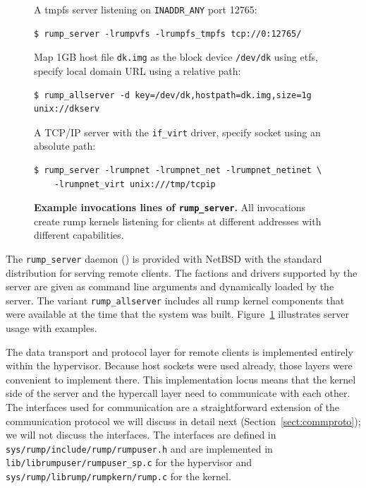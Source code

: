 \begin{figure}[t]
\begin{flushleft}
A tmpfs server listening on \verb+INADDR_ANY+ port 12765:
{\small
\begin{verbatim}
$ rump_server -lrumpvfs -lrumpfs_tmpfs tcp://0:12765/
\end{verbatim}}
Map 1GB host file \texttt{dk.img} as the block device \texttt{/dev/dk}
using etfs, specify local domain URL using a relative path:
{\small
\begin{verbatim}
$ rump_allserver -d key=/dev/dk,hostpath=dk.img,size=1g unix://dkserv
\end{verbatim}}
A TCP/IP server with the \verb+if_virt+ driver, specify socket using
an absolute path:
{\small
\begin{verbatim}
$ rump_server -lrumpnet -lrumpnet_net -lrumpnet_netinet \
    -lrumpnet_virt unix:///tmp/tcpip
\end{verbatim}}
\end{flushleft}
\caption[Example invocations lines of \texttt{rump\_server}]{
\textbf{Example invocations lines of \texttt{rump\_server}.}
All invocations create rump kernels listening for clients at different
addresses with different capabilities.
}
\label{fig:rumpserver}
\end{figure}

The \verb+rump_server+ daemon ()
is provided with NetBSD with the standard distribution for serving
remote clients.  The factions and drivers supported by the server
are given as command line arguments and dynamically loaded by the
server.  The variant \verb+rump_allserver+ includes all rump kernel
components that were available at the time that the system was
built.  Figure~\ref{fig:rumpserver} illustrates server usage with
examples.

The data transport and protocol layer for remote clients is
implemented entirely within the hypervisor.  Because host
sockets were used already, those layers were convenient to implement there.
This implementation locus means that the kernel side of the server and the hypercall
layer need to communicate with each other.  The interfaces used for
communication are a straightforward extension of the
communication protocol we will discuss in detail next
(Section~\ref{sect:commproto}); we will not discuss the interfaces.
The interfaces are defined in \texttt{sys/rump/include/rump/rumpuser.h}
and are implemented in \verb+lib/librumpuser/rumpuser_sp.c+ for
the hypervisor and \verb+sys/rump/librump/rumpkern/rump.c+ for the
kernel.

